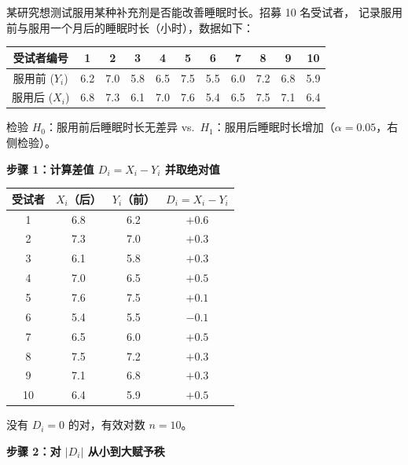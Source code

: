 \begin{example}
某研究想测试服用某种补充剂是否能改善睡眠时长。招募 10 名受试者，
记录服用前与服用一个月后的睡眠时长（小时），数据如下：\par
\medskip
\begin{center}
\begin{tabular}{c|cccccccccc}
    \toprule
    受试者编号 & 1 & 2 & 3 & 4 & 5 & 6 & 7 & 8 & 9 & 10 \\
    \midrule
    服用前 ($Y_i$) & 6.2 & 7.0 & 5.8 & 6.5 & 7.5 & 5.5 & 6.0 & 7.2 & 6.8 & 5.9 \\
    服用后 ($X_i$) & 6.8 & 7.3 & 6.1 & 7.0 & 7.6 & 5.4 & 6.5 & 7.5 & 7.1 & 6.4 \\
    \bottomrule
\end{tabular}
\end{center}

检验 $H_0$：服用前后睡眠时长无差异 vs.\ $H_1$：服用后睡眠时长增加（$\alpha = 0.05$，右侧检验）。

\textbf{步骤 1：计算差值 $D_i = X_i - Y_i$ 并取绝对值}

\begin{center}
\begin{tabular}{c|c|c|c}
    \toprule
    受试者 & $X_i$（后） & $Y_i$（前） & $D_i = X_i - Y_i$ \\
    \midrule
    1  & 6.8 & 6.2 & $+0.6$ \\
    2  & 7.3 & 7.0 & $+0.3$ \\
    3  & 6.1 & 5.8 & $+0.3$ \\
    4  & 7.0 & 6.5 & $+0.5$ \\
    5  & 7.6 & 7.5 & $+0.1$ \\
    6  & 5.4 & 5.5 & $-0.1$ \\
    7  & 6.5 & 6.0 & $+0.5$ \\
    8  & 7.5 & 7.2 & $+0.3$ \\
    9  & 7.1 & 6.8 & $+0.3$ \\
    10 & 6.4 & 5.9 & $+0.5$ \\
    \bottomrule
\end{tabular}
\end{center}

没有 $D_i = 0$ 的对，有效对数 $n = 10$。

\textbf{步骤 2：对 $|D_i|$ 从小到大赋予秩}


\end{example}
